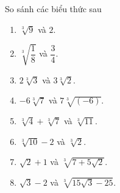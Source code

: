 \begin{bt}
So sánh các biểu thức sau
\begin{multicols}{2}
\begin{enumerate}
	\item $ \sqrt[3]{9} $ và $ 2 $.
	\item $ \sqrt[3]{\dfrac{1}{8}} $ và $ \dfrac{3}{4} $.
	\item $ 2\sqrt[3]{3} $ và $ 3\sqrt[3]{2} $.
	\item $ -6\sqrt[3]{7} $ và $ 7\sqrt[3]{\left(-6\right)} $.
	\item $ \sqrt[3]{4} + \sqrt[3]{7} $ và $ \sqrt[3]{11} $.
	\item $ \sqrt[3]{10} - 2 $ và $ \sqrt[3]{2} $.
	\item $ \sqrt{2} + 1 $ và $ \sqrt[3]{7 + 5\sqrt{2}} $.
	\item $ \sqrt{3} - 2 $ và $ \sqrt[3]{15\sqrt{3} - 25} $.
\end{enumerate}
\end{multicols}


\end{bt}
